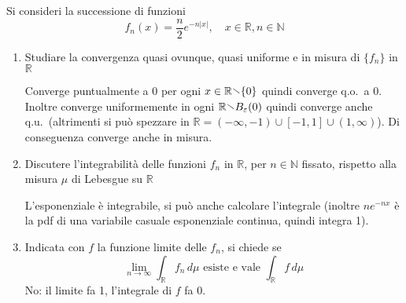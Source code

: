 \begin{eser}[Es. 1 del 27 \-- 11 \-- 2018]
    Si consideri la successione di funzioni
    \[
      f_{n}{(x)} = \frac{n}{2}e^{-n|x|}, \quad x \in \mathbb{R}, n \in \mathbb{N}
    \]
\begin{enumerate}[label = \alph*.]
    \item Studiare la convergenza quasi ovunque, quasi uniforme e in misura di
        \(\{f_{n}\} \) in \(\mathbb{R}\) 

        Converge puntualmente a \(0\) per ogni \(x \in \mathbb{R} \sminus \{0\}
        \) quindi converge q.o.~a \(0\). Inoltre converge uniformemente in ogni
        \(\mathbb{R} \sminus B_{\varepsilon} {(0)}\) quindi converge anche
        q.u.~(altrimenti si può spezzare in \(\mathbb{R} = {(-\infty, -1)} \cup
        [-1, 1] \cup {(1, \infty)}\)). Di conseguenza converge anche in misura.
    \item Discutere l'integrabilità delle funzioni \(f_{n}\) in \(\mathbb{R}\),
        per \(n \in \mathbb{N}\) fissato, rispetto alla misura \(\mu\) di
        Lebesgue su \(\mathbb{R}\) 

        L'esponenziale è integrabile, si può anche calcolare l'integrale
        (inoltre \(ne^{-nx}\) è la pdf di una variabile casuale esponenziale
        continua, quindi integra 1).
    \item Indicata con \(f\) la funzione limite delle \(f_{n}\), si chiede se
        \[
          \lim_{n \to \infty} \int _{\mathbb{R}} f_{n} \,d \mu \text{ esiste e vale
          } \int _{\mathbb{R}} f \,d \mu
        \]
        No: il limite fa 1, l'integrale di \(f\) fa 0.
\end{enumerate}
\end{eser}

